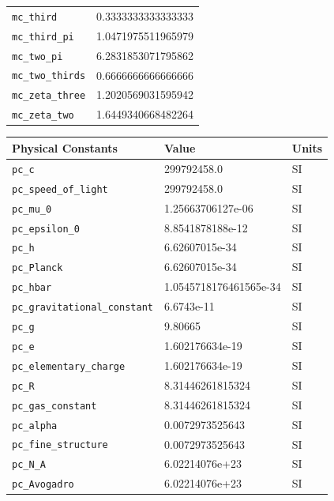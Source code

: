 \begin{tabular}{ll}
{\tt mc\_third} \index{mc\_third}  & 0.3333333333333333 \\
{\tt mc\_third\_pi} \index{mc\_third\_pi}  & 1.0471975511965979 \\
{\tt mc\_two\_pi} \index{mc\_two\_pi}  & 6.2831853071795862 \\
{\tt mc\_two\_thirds} \index{mc\_two\_thirds}  & 0.6666666666666666 \\
{\tt mc\_zeta\_three} \index{mc\_zeta\_three}  & 1.2020569031595942 \\
{\tt mc\_zeta\_two} \index{mc\_zeta\_two}  & 1.6449340668482264 \\
\end{tabular}


\begin{tabular}{lll} \hline
Physical Constants & Value & Units \\ \hline
{\tt pc\_c} \index{pc\_c}  & 299792458.0 & SI \\
{\tt pc\_speed\_of\_light} \index{pc\_speed\_of\_light}  & 299792458.0 & SI \\
{\tt pc\_mu\_0} \index{pc\_mu\_0}  & 1.25663706127e-06 & SI \\
{\tt pc\_epsilon\_0} \index{pc\_epsilon\_0}  & 8.8541878188e-12 & SI \\
{\tt pc\_h} \index{pc\_h}  & 6.62607015e-34 & SI \\
{\tt pc\_Planck} \index{pc\_Planck}  & 6.62607015e-34 & SI \\
{\tt pc\_hbar} \index{pc\_hbar}  & 1.0545718176461565e-34 & SI \\
{\tt pc\_gravitational\_constant} \index{pc\_gravitational\_constant}  & 6.6743e-11 & SI \\
{\tt pc\_g} \index{pc\_g}  & 9.80665 & SI \\
{\tt pc\_e} \index{pc\_e}  & 1.602176634e-19 & SI \\
{\tt pc\_elementary\_charge} \index{pc\_elementary\_charge}  & 1.602176634e-19 & SI \\
{\tt pc\_R} \index{pc\_R}  & 8.31446261815324 & SI \\
{\tt pc\_gas\_constant} \index{pc\_gas\_constant}  & 8.31446261815324 & SI \\
{\tt pc\_alpha} \index{pc\_alpha}  & 0.0072973525643 & SI \\
{\tt pc\_fine\_structure} \index{pc\_fine\_structure}  & 0.0072973525643 & SI \\
{\tt pc\_N\_A} \index{pc\_N\_A}  & 6.02214076e+23 & SI \\
{\tt pc\_Avogadro} \index{pc\_Avogadro}  & 6.02214076e+23 & SI \\

\end{tabular}
